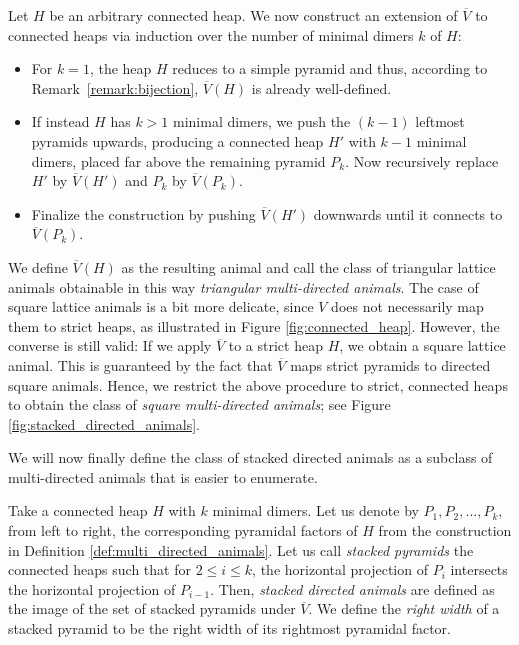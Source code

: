 \begin{definition}
\label{def:multi_directed_animals}
  Let $H$ be an arbitrary connected heap. We now construct an extension of $\overline{V}$ to connected heaps via induction over the number of minimal dimers $k$ of $H$:
  \begin{itemize}
    \item For $k = 1$, the heap $H$ reduces to a simple pyramid and thus, according to Remark~\ref{remark:bijection}, $\overline{V}(H)$ is already well-defined.
    \item If instead $H$ has $k > 1$ minimal dimers, we push the $(k-1)$ leftmost pyramids upwards, producing a connected heap $H'$ with $k-1$ minimal dimers, placed far above the remaining pyramid $P_k$. Now recursively replace $H'$ by $\overline{V}(H')$ and $P_k$ by $\overline{V}(P_k)$.
    \item Finalize the construction by pushing $\overline{V}(H')$ downwards until it connects to $\overline{V}(P_k)$.
  \end{itemize}
  We define $\overline{V}(H)$ as the resulting animal and call the class of triangular lattice animals obtainable in this way \textit{triangular multi-directed animals}.
  The case of square lattice animals is a bit more delicate, since $V$ does not necessarily map them to strict heaps, as illustrated in Figure \ref{fig:connected_heap}. However, the converse is still valid: If we apply $\overline{V}$ to a strict heap $H$, we obtain a square lattice animal. This is guaranteed by the fact that $\overline{V}$ maps strict pyramids to directed square animals. 
  Hence, we restrict the above procedure to strict, connected heaps to obtain the class of \textit{square multi-directed animals}; see Figure \ref{fig:stacked_directed_animals}.
\end{definition}

We will now finally define the class of stacked directed animals as a subclass of multi-directed animals that is easier to enumerate.

\begin{definition}
  Take a connected heap $H$ with $k$ minimal dimers. Let us denote by $P_1,P_2,\dots,P_k$, from left to right, the corresponding pyramidal factors of $H$ from the construction in Definition \ref{def:multi_directed_animals}. Let us call \textit{stacked pyramids} the connected heaps such that for $2 \leq i \leq k$, the horizontal projection of $P_i$ intersects the horizontal projection of $P_{i-1}$. Then, \textit{stacked directed animals} are defined as the image of the set of stacked pyramids under $\overline{V}$.
  We define the \textit{right width} of a stacked pyramid to be the right width of its rightmost pyramidal factor. 
\end{definition}

